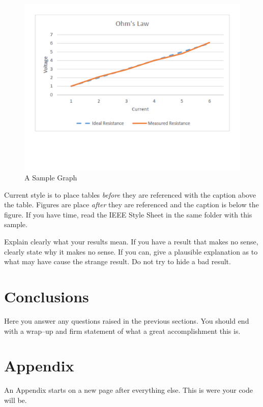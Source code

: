 \documentclass[onecolumn, 12pt, article]{IEEEtran}
\numberwithin{case}{problem}
\numberwithin{condition}{problem}
\numberwithin{condition}{subsection}
\numberwithin{definition}{section}
\theoremstyle{remark}
\numberwithin{question}{problem}
\theoremstyle{plain}
\numberwithin{answer}{problem}
\numberwithin{solution}{section}
\numberwithin{equation}{section}%
\begin{document}
\begin{figure}[!]
\centering
\includegraphics[width=0.7\linewidth]{./figure.pdf}
\caption{A Sample Graph}
\label{fig:figureforprinting}
\end{figure}
Current style is to place tables \emph{before} they are referenced with the caption above the table.  Figures are place \emph{after} they are referenced and the caption is below the figure.  If you have time, read the IEEE Style Sheet in the same folder with this sample.

Explain clearly what your results mean.  If you have a result that makes no sense, clearly state why it makes no sense.  If you can, give a plausible explanation as to what may have cause the strange result.  Do not try to hide a bad result.

\section{Conclusions}
Here you answer any questions raised in the previous sections.   You should end with a wrap--up and firm statement of what a great accomplishment this is.





\newpage
\section*{Appendix}
An Appendix starts on a new page after everything else.  This is were your code will be.\\\\


\end{document}
